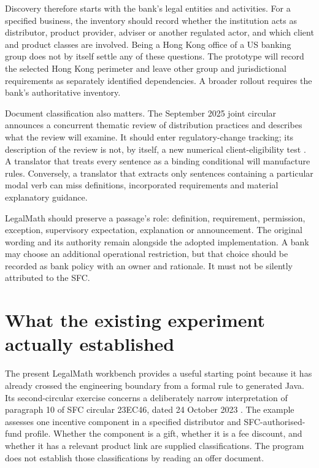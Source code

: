 Discovery therefore starts with the bank's legal entities and activities. For a
specified business, the inventory should record whether the institution acts as
distributor, product provider, adviser or another regulated actor, and which
client and product classes are involved. Being a Hong Kong office of a US banking
group does not by itself settle any of these questions. The prototype will record
the selected Hong Kong perimeter and leave other group and jurisdictional
requirements as separately identified dependencies. A broader rollout requires
the bank's authoritative inventory.

Document classification also matters. The September 2025 joint circular announces
a concurrent thematic review of distribution practices and describes what the
review will examine. It should enter regulatory-change tracking; its description
of the review is not, by itself, a new numerical client-eligibility test
\citep{sfcreview2025}. A translator that treats every sentence as a binding
conditional will manufacture rules. Conversely, a translator that extracts only
sentences containing a particular modal verb can miss definitions, incorporated
requirements and material explanatory guidance.

LegalMath should preserve a passage's role: definition, requirement, permission,
exception, supervisory expectation, explanation or announcement. The original
wording and its authority remain alongside the adopted implementation. A bank may
choose an additional operational restriction, but that choice should be recorded
as bank policy with an owner and rationale. It must not be silently attributed to
the SFC.

\section{What the existing experiment actually established}
\label{merge:M01:01}

\label{sec:problem-evidence}
The present LegalMath workbench provides a useful starting point because it has
already crossed the engineering boundary from a formal rule to generated Java.
Its second-circular exercise concerns a deliberately narrow interpretation of
paragraph 10 of SFC circular 23EC46, dated 24 October 2023
\citep{sfcmarketing}. The example assesses one incentive component in a specified
distributor and SFC-authorised-fund profile. Whether the component is a gift,
whether it is a fee discount, and whether it has a relevant product link are
supplied classifications. The program does not establish those classifications
by reading an offer document.


